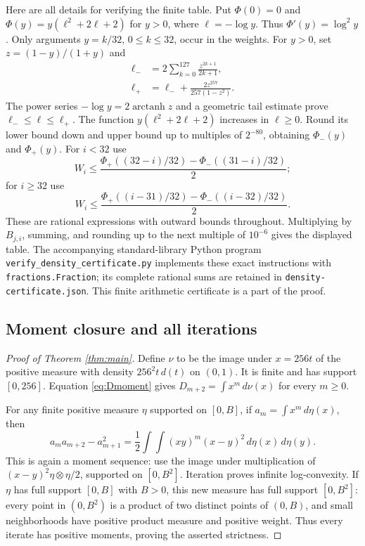 \documentclass[11pt]{article}
\begin{document}
Here are all details for verifying the finite table. Put
$\Phi(0)=0$ and
$\Phi(y)=y(\ell^2+2\ell+2)$ for $y>0$, where $\ell=-\log y$.
Thus $\Phi'(y)=\log^2y$.
Only arguments $y=k/32$, $0\leq k\leq32$, occur in the weights.
For $y>0$, set $z=(1-y)/(1+y)$ and
\begin{align*}
 \ell_-&=2\sum_{k=0}^{127}\frac{z^{2k+1}}{2k+1},\\
 \ell_+&=\ell_-+\frac{2z^{257}}{257(1-z^2)}.
\end{align*}
The power series $-\log y=2\operatorname{arctanh}z$ and a geometric
tail estimate prove $\ell_-\leq\ell\leq\ell_+$.
The function $y(\ell^2+2\ell+2)$ increases in $\ell\geq0$.
Round its lower bound down and upper bound up to multiples of $2^{-80}$,
obtaining $\Phi_-(y)$ and $\Phi_+(y)$. For $i<32$ use
\[
 W_i\leq\frac{\Phi_+((32-i)/32)-\Phi_-((31-i)/32)}2;
\]
for $i\geq32$ use
\[
 W_i\leq\frac{\Phi_+((i-31)/32)-\Phi_-((i-32)/32)}2.
\]
These are rational expressions with outward bounds throughout.
Multiplying by $B_{j,i}$, summing, and rounding up to the next
multiple of $10^{-6}$ gives the displayed table.
The accompanying standard-library Python program
\texttt{verify\_density\_certificate.py} implements these exact
instructions with \texttt{fractions.Fraction}; its complete rational
sums are retained in \texttt{density-certificate.json}.
This finite arithmetic certificate is a part of the proof.

\subsection*{Moment closure and all iterations}
\begin{proof}[Proof of Theorem \ref{thm:main}]
Define $\nu$ to be the image under $x=256t$ of the positive measure
with density $256^2t\,d(t)$ on $(0,1)$.
It is finite and has support $[0,256]$. Equation \eqref{eq:Dmoment}
gives $D_{m+2}=\int x^m\,d\nu(x)$ for every $m\geq0$.

For any finite positive measure $\eta$ supported on $[0,B]$, if
$a_m=\int x^m\,d\eta(x)$, then
\[
 a_ma_{m+2}-a_{m+1}^2
 =\frac12\int\!\int(xy)^m(x-y)^2\,d\eta(x)\,d\eta(y).
\]
This is again a moment sequence: use the image under multiplication
of $(x-y)^2\eta\otimes\eta/2$, supported on $[0,B^2]$.
Iteration proves infinite log-convexity.
If $\eta$ has full support $[0,B]$ with $B>0$, this new measure has
full support $[0,B^2]$: every point in $(0,B^2)$ is a product of two
distinct points of $(0,B)$, and small neighborhoods have positive
product measure and positive weight. Thus every iterate has positive
moments, proving the asserted strictness.
\end{proof}
\end{document}
